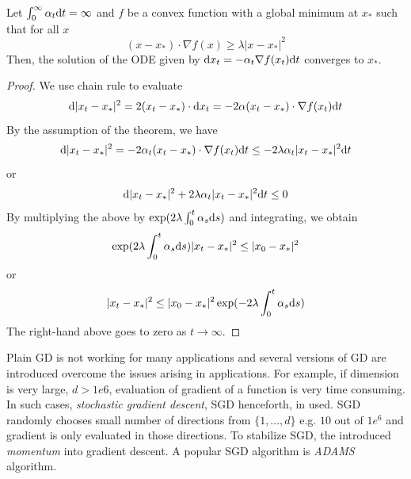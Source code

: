 \documentclass[11pt]{book}
\newcommand{\dd}{\text{\normalfont d}}
\newcommand{\dt}{\text{\normalfont d}t}
\newcommand{\ds}{\text{\normalfont d}s}
\newcommand{\dx}{\text{\normalfont d}x}
\begin{document}
\begin{thm}
    Let $\int_0^\infty\alpha_t\dt=\infty$ and $f$ be a convex function with a global minimum at $x_*$ such that for all $x$
    \[
    (x-x_*)\cdot \nabla f(x) \ge \lambda |x-x_*|^2
    \]
    Then, the solution of the ODE given by $\dd x_t = -\alpha_t \nabla f(x_t) \dt$ converges to $x_*$. 
\end{thm}
\begin{proof}
    We use chain rule to evaluate 
    \[
    \dd |x_t-x_*|^2 = 2(x_t-x_*)\cdot \dx_t = -2 \alpha (x_t-x_*)\cdot\nabla f(x_t) \dt
    \]
    By the assumption of the theorem, we have
    \[
    \dd |x_t-x_*|^2 = -2 \alpha_t (x_t-x_*)\cdot\nabla f(x_t) \dt\le -2\lambda\alpha_t |x_t-x_*|^2\dt
    \]
    or
    \[
    \dd |x_t-x_*|^2 + 2\lambda\alpha_t |x_t-x_*|^2\dt \le 0
    \]
    By multiplying the above by $\exp(2\lambda\int_0^t\alpha_s\ds)$ and integrating, we obtain
    \[
    \exp(2\lambda\int_0^t\alpha_s\ds)|x_t-x_*|^2\le |x_0-x_*|^2
    \]
    or
    \[
    |x_t-x_*|^2\le |x_0-x_*|^2\exp(-2\lambda\int_0^t\alpha_s\ds)
    \]
    The right-hand above goes to zero as $t\to\infty$.
\end{proof}

Plain GD is not working for many applications and several versions of GD are introduced overcome the issues arising in applications. For example, if dimension is very large, $d>1e6$, evaluation of gradient of a function is very time consuming. In such cases, \emph{stochastic gradient descent}, SGD henceforth, in used. SGD randomly chooses small number of directions from $\{1,...,d\}$ e.g. $10$ out of $1e^6$ and gradient is only evaluated in those directions. To stabilize SGD, the introduced \emph{momentum} into gradient descent. A popular SGD algorithm is \emph{ADAMS} algorithm. 

\newpage 
\end{document}
